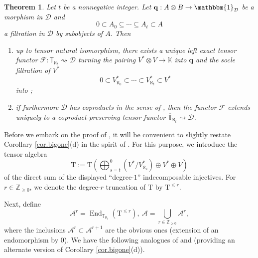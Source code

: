 \documentclass[11pt]{article}
\renewcommand{\labelenumi}{(\arabic{enumi})}
\theoremstyle{plain}
\newtheorem{theorem}[lemma]{Theorem}
\theoremstyle{nonumberplain}
\theoremstyle{plain}
\theoremstyle{nonumberplain}
\newcommand\bK{\mathbb K}
\newcommand\bT{\mathbb T}
\newcommand\cA{\mathcal A}
\newcommand\cD{\mathcal D}
\DeclareMathOperator{\End}{\mathrm{End}}
\begin{document}
\begin{theorem}\label{th.univ}
  Let $t$ be a nonnegative integer. Let $\mathbf{q}:A\otimes B\to \mathbbm{1}_\cD$ be a morphism in $\cD$ and 
  \begin{equation}\label{eq:filt-x}
    0\subset A_0\subseteq\cdots\subseteq A_{t}\subset A
  \end{equation}
a filtration in $\cD$ by subobjects of $A$. Then
\begin{enumerate}
\renewcommand{\labelenumi}{(\alph{enumi})}
\item up to tensor natural isomorphism, there exists a unique left
  exact tensor functor $\mathcal{F}:\bT_{\aleph_t}  \rightsquigarrow \cD$ turning the pairing
  $V^*\otimes V\to \bK$ into $\mathbf{q}$ and the socle filtration of $V^*$
  \begin{equation*}
    0\subset V^*_{\aleph_0}\subset\cdots\subset V^*_{\aleph_{t}}\subset V^*
  \end{equation*}
  into ;
\item if furthermore $\cD$ has coproducts in the sense of
  , then the functor $\mathcal{F}$ extends uniquely to a
  coproduct-preserving tensor functor
  $\overline{\bT}_{\aleph_t}  \rightsquigarrow \cD$.
\end{enumerate}
\end{theorem}


Before we embark on the proof of , it will
be convenient to slightly restate Corollary \ref{cor.bigone}(d) in
the spirit of \cite[$\S$3.4]{us}. For this purpose, we introduce
the tensor algebra
\begin{equation*}
  \mathrm{T}:=\mathrm{T}\left(\bigoplus_{s=t}^0(V^*/V_{\aleph_s}^*)\oplus V^*\oplus V\right) 
\end{equation*}
of the direct sum of the displayed ``degree-$1$'' indecomposable injectives. For $r\in\mathbb{Z}_{\geq 0}$, we
denote the degree-$r$ truncation of $\mathrm{T}$ by
$\mathrm{T}^{\le r}$.

Next, define 
\begin{equation*}
  \cA^r=\End_{\bT_{\aleph_t}}(\mathrm{T}^{\le r}),\ \cA=\bigcup_{r\in\mathbb{Z}_{\geq 0}} \cA^r,
\end{equation*}
where the inclusions $\cA^r\subset \cA^{r+1}$ are the obvious
ones (extension of an endomorphism by $0$). We have the following analogues of \cite[Definition 3.18]{us}
and \cite[Theorem 3.19]{us} (providing an alternate version of
Corollary \ref{cor.bigone}(d)).
\end{document}
